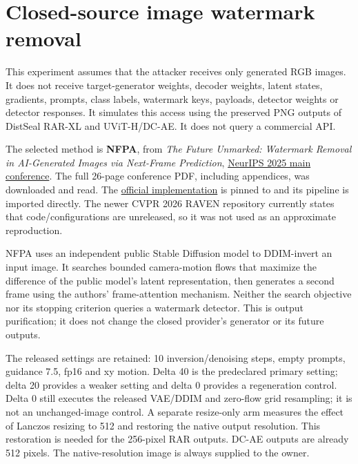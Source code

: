 \section{Closed-source image watermark
removal}\label{record-docs-closed-image-watermarking-md-closed-source-image-watermark-removal}

This experiment assumes that the attacker receives only generated RGB
images. It does not receive target-generator weights, decoder weights,
latent states, gradients, prompts, class labels, watermark keys,
payloads, detector weights or detector responses. It simulates this
access using the preserved PNG outputs of DistSeal RAR-XL and
UViT-H/DC-AE. It does not query a commercial API.

The selected method is \textbf{NFPA}, from \emph{The Future Unmarked:
Watermark Removal in AI-Generated Images via Next-Frame Prediction},
\href{https://proceedings.neurips.cc/paper_files/paper/2025/hash/b48405307576689bea14d221ccba73ae-Abstract-Conference.html}{NeurIPS
2025 main conference}. The full 26-page conference PDF, including
appendices, was downloaded and read. The
\href{https://github.com/1249748036/NFPA}{official implementation} is
pinned to \texttt{}
and its pipeline is imported directly. The newer CVPR 2026 RAVEN
repository currently states that code/configurations are unreleased, so
it was not used as an approximate reproduction.

NFPA uses an independent public Stable Diffusion model to DDIM-invert an
input image. It searches bounded camera-motion flows that maximize the
difference of the public model's latent representation, then generates a
second frame using the authors' frame-attention mechanism. Neither the
search objective nor its stopping criterion queries a watermark
detector. This is output purification; it does not change the closed
provider's generator or its future outputs.

The released settings are retained: 10 inversion/denoising steps, empty
prompts, guidance 7.5, fp16 and xy motion. Delta 40 is the predeclared
primary setting; delta 20 provides a weaker setting and delta 0 provides
a regeneration control. Delta 0 still executes the released VAE/DDIM and
zero-flow grid resampling; it is not an unchanged-image control. A
separate resize-only arm measures the effect of Lanczos resizing to 512
and restoring the native output resolution. This restoration is needed
for the 256-pixel RAR outputs. DC-AE outputs are already 512 pixels. The
native-resolution image is always supplied to the owner.

